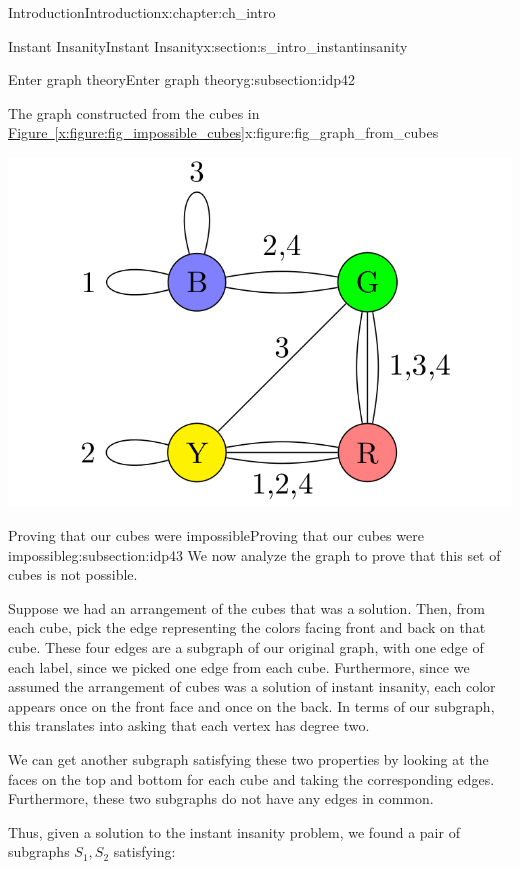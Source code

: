 \documentclass[oneside,10pt,]{book}
\newcommand{\xreffont}{\relax}
\numberwithin{equation}{section}
\begin{document}
\begin{chapterptx}{Introduction}{}{Introduction}{}{}{x:chapter:ch_intro}
\begin{sectionptx}{Instant Insanity}{}{Instant Insanity}{}{}{x:section:s_intro_instantinsanity}
\begin{subsectionptx}{Enter graph theory}{}{Enter graph theory}{}{}{g:subsection:idp42}
\begin{figureptx}{The graph constructed from the cubes in \hyperref[x:figure:fig_impossible_cubes]{Figure~{\xreffont\ref{x:figure:fig_impossible_cubes}}}}{x:figure:fig_graph_from_cubes}{}
\begin{image}{0.05}{0.9}{0.05}%
\includegraphics[width=\linewidth]{images/InstantInsanityImpossibleGraph.png}
\end{image}%
\tcblower
\end{figureptx}%
\end{subsectionptx}
%
%
\typeout{************************************************}
\typeout{************************************************}
%
\begin{subsectionptx}{Proving that our cubes were impossible}{}{Proving that our cubes were impossible}{}{}{g:subsection:idp43}
We now analyze the graph to prove that this set of cubes is not possible.%
\par
Suppose we had an arrangement of the cubes that was a solution. Then, from each cube, pick the edge representing the colors facing front and back on that cube. These four edges are a subgraph of our original graph, with one edge of each label, since we picked one edge from each cube. Furthermore, since we assumed the arrangement of cubes was a solution of instant insanity, each color appears once on the front face and once on the back. In terms of our subgraph, this translates into asking that each vertex has degree two.%
\par
We can get another subgraph satisfying these two properties by looking at the faces on the top and bottom for each cube and taking the corresponding edges. Furthermore, these two subgraphs do not have any edges in common.%
\par
Thus, given a solution to the instant insanity problem, we found a pair of subgraphs \(S_1, S_2\) satisfying:%

\end{subsectionptx}
\end{sectionptx}
\end{chapterptx}
\end{document}
